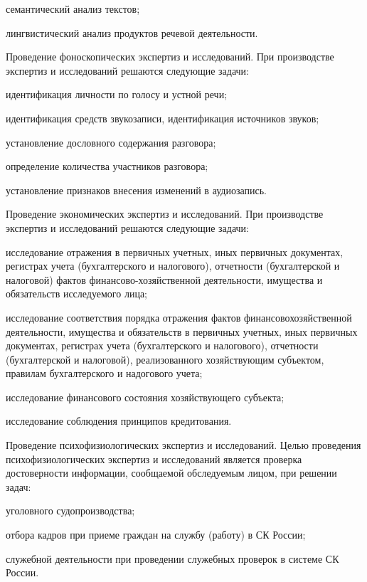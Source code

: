 \begin{enumerate*}
\begin{itemize*}
		\item семантический анализ текстов;
		\item лингвистический анализ продуктов речевой деятельности.
	\end{itemize*}
	\item Проведение	фоноскопических	экспертиз	и	исследований.	При
производстве экспертиз и исследований решаются следующие задачи:
	\begin{itemize*}
		\item идентификация личности по голосу и устной речи;
		\item идентификация средств звукозаписи, идентификация источников звуков;
		\item установление дословного содержания разговора;
		\item определение количества участников разговора;
		\item установление признаков внесения изменений в аудиозапись.
	\end{itemize*}
	\item Проведение экономических экспертиз и исследований. При производстве экспертиз и исследований решаются следующие задачи:
	\begin{itemize*}
		\item исследование отражения в первичных учетных, иных первичных документах, регистрах учета (бухгалтерского и налогового), отчетности (бухгалтерской и налоговой) фактов финансово-хозяйственной деятельности, имущества и обязательств исследуемого лица;
		\item исследование соответствия порядка отражения фактов финансовохозяйственной деятельности, имущества и обязательств в первичных учетных, иных первичных документах, регистрах учета (бухгалтерского и налогового), отчетности (бухгалтерской и налоговой), реализованного хозяйствующим субъектом, правилам бухгалтерского и надогового учета;
		\item исследование финансового состояния хозяйствующего субъекта;
		\item исследование соблюдения принципов кредитования.
	\end{itemize*}
	\item Проведение психофизиологических экспертиз и исследований. Целью проведения психофизиологических экспертиз и исследований является проверка достоверности информации, сообщаемой обследуемым лицом, при решении задач:
	\begin{itemize*}
		\item уголовного судопроизводства;
		\item отбора кадров при приеме граждан на службу (работу) в СК России;
		\item служебной деятельности при проведении служебных проверок в системе СК России.
	\end{itemize*}
\end{enumerate*}


